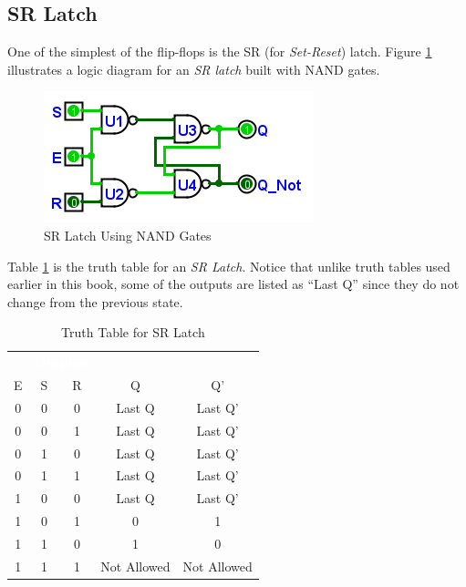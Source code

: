\subsection{SR Latch}
\label{SL:subsec:sr_latch}

One of the simplest of the flip-flops is the SR (for \emph{Set-Reset}) latch.  Figure \ref{fig:09_01} illustrates a logic diagram for an \emph{SR latch} built with \textsf{NAND} gates.

\begin{figure}[H]
	\centering
	\includegraphics[width=\maxwidth{.95\linewidth}]{gfx/09_01}
	\caption{SR Latch Using NAND Gates}
	\label{fig:09_01}
\end{figure}

Table \ref{tab:09_01} is the truth table for an \emph{SR Latch}. Notice that unlike truth tables used earlier in this book, some of the outputs are listed as ``Last Q'' since they do not change from the previous state.

\begin{table}[H]
  \sffamily
  \newcommand{\head}[1]{\textcolor{white}{\textbf{#1}}}    
  \begin{center}
    \begin{tabular}{ccccc} 
      \rowcolor{black!75}
      \multicolumn{3}{c}{\head{Inputs}} & \multicolumn{2}{c}{\head{Outputs}} \\
      E & S & R & Q & Q' \\
      \hline
      0 & 0 & 0 & Last Q & Last Q' \\
      0 & 0 & 1 & Last Q & Last Q' \\
      0 & 1 & 0 & Last Q & Last Q' \\
      0 & 1 & 1 & Last Q & Last Q' \\
      1 & 0 & 0 & Last Q & Last Q' \\
      1 & 0 & 1 & 0 & 1 \\
      1 & 1 & 0 & 1 & 0 \\
      1 & 1 & 1 & Not Allowed & Not Allowed \\
    \end{tabular}
  \end{center}
  \caption{Truth Table for SR Latch}
  \label{tab:09_01}
\end{table}

